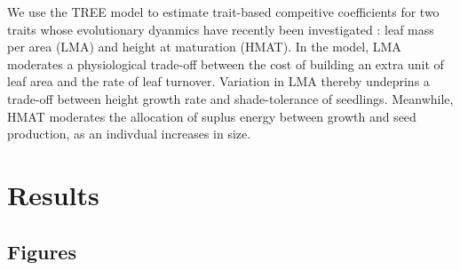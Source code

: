 \documentclass[a4paper,11pt]{article}
\begin{document}
We use the TREE model to estimate trait-based compeitive coefficients for
two traits whose evolutionary dyanmics have recently been investigated
\citet{Falster-2015}: leaf mass per area (LMA) and height at maturation
(HMAT). In the model, LMA moderates a physiological trade-off between the cost
of building an extra unit of leaf area and the rate of leaf turnover.
Variation in LMA thereby undeprins a trade-off between height growth rate and
shade-tolerance of seedlings. Meanwhile, HMAT moderates the allocation of
suplus energy between growth and seed production, as an indivdual increases in
size.

\clearpage

\section{Results}

\subsection{Figures}
\end{document}
